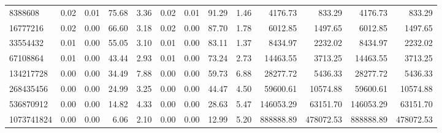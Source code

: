 \begin{tabular}{lrrrrrrrrrrrr}
8388608 & 0.02 & 0.01 & 75.68 & 3.36 & 0.02 & 0.01 & 91.29 & 1.46 & 4176.73 & 833.29 & 4176.73 & 833.29 \\
16777216 & 0.02 & 0.00 & 66.60 & 3.18 & 0.02 & 0.00 & 87.70 & 1.78 & 6012.85 & 1497.65 & 6012.85 & 1497.65 \\
33554432 & 0.01 & 0.00 & 55.05 & 3.10 & 0.01 & 0.00 & 83.11 & 1.37 & 8434.97 & 2232.02 & 8434.97 & 2232.02 \\
67108864 & 0.01 & 0.00 & 43.44 & 2.93 & 0.01 & 0.00 & 73.24 & 2.73 & 14463.55 & 3713.25 & 14463.55 & 3713.25 \\
134217728 & 0.00 & 0.00 & 34.49 & 7.88 & 0.00 & 0.00 & 59.73 & 6.88 & 28277.72 & 5436.33 & 28277.72 & 5436.33 \\
268435456 & 0.00 & 0.00 & 24.99 & 3.25 & 0.00 & 0.00 & 44.47 & 4.50 & 59600.61 & 10574.88 & 59600.61 & 10574.88 \\
536870912 & 0.00 & 0.00 & 14.82 & 4.33 & 0.00 & 0.00 & 28.63 & 5.47 & 146053.29 & 63151.70 & 146053.29 & 63151.70 \\
1073741824 & 0.00 & 0.00 & 6.06 & 2.10 & 0.00 & 0.00 & 12.99 & 5.20 & 888888.89 & 478072.53 & 888888.89 & 478072.53 \\
\bottomrule
\end{tabular}
